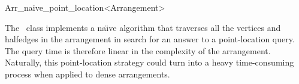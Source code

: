 
\ccRefPageBegin

\begin{ccRefClass}{Arr_naive_point_location<Arrangement>}
\label{arr_ref:naive_pl}

\ccDefinition

The \ccRefName\ class implements a na\"{\i}ve algorithm that traverses
all the vertices and halfedges in the arrangement in search for an
answer to a point-location query.
The query time is therefore linear in the complexity of the arrangement.
Naturally, this point-location strategy could turn into a heavy
time-consuming process when applied to dense arrangements.


\ccIsModel
   \\

\end{ccRefClass}

\ccRefPageEnd
